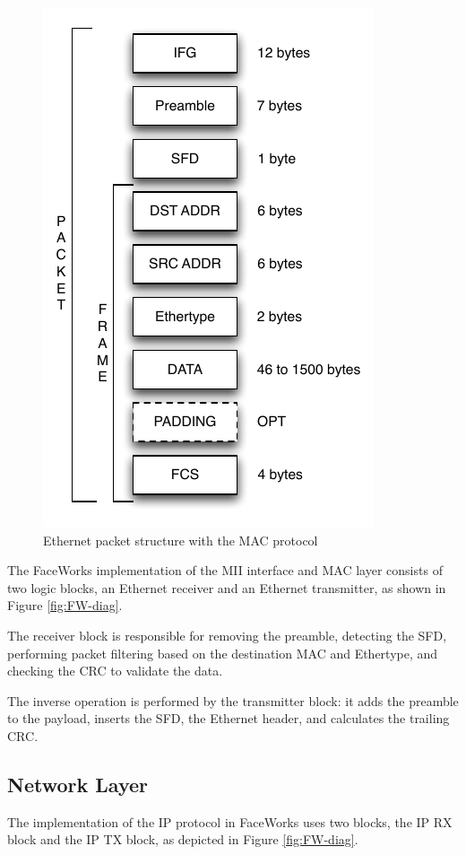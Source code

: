 \documentclass[conference]{IEEEtran}
\begin{document}
\begin{figure}[h]
  \centering
      \includegraphics[scale=0.8,center]{Diagrams/MAC-FRAME.pdf}
  \caption{Ethernet packet structure with the MAC protocol}\label{fig:Eth-frame}
\end{figure}

The FaceWorks implementation of the MII interface and MAC layer consists of two logic blocks, an Ethernet receiver and an Ethernet transmitter, as shown in Figure \ref{fig:FW-diag}.

The receiver block is responsible for removing the preamble, detecting the SFD, performing packet filtering based on the destination MAC and Ethertype, and checking the CRC to validate the data.

The inverse operation is performed by the transmitter block: it adds the preamble to the payload, inserts the SFD, the Ethernet header, and calculates the trailing CRC.


\subsection{Network Layer}

The implementation of the IP protocol in FaceWorks uses two blocks, the IP RX block and the IP TX block, as depicted in Figure \ref{fig:FW-diag}. 
\end{document}
